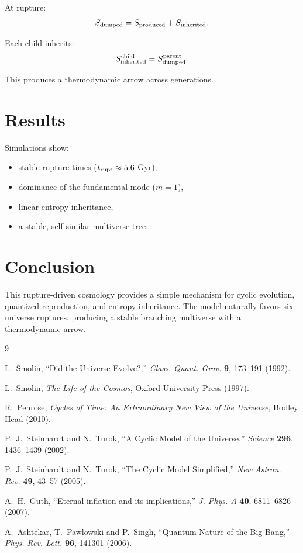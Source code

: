 \documentclass[12pt]{article}
\begin{document}
At rupture:
\begin{equation}
S_{\rm dumped} = S_{\rm produced} + S_{\rm inherited}.
\end{equation}

Each child inherits:
\begin{equation}
S_{\rm inherited}^{\rm child} = S_{\rm dumped}^{\rm parent}.
\end{equation}

This produces a thermodynamic arrow across generations.

\section{Results}

Simulations show:
\begin{itemize}
\item stable rupture times ($t_{\rm rupt} \approx 5.6$ Gyr),
\item dominance of the fundamental mode ($m=1$),
\item linear entropy inheritance,
\item a stable, self-similar multiverse tree.
\end{itemize}

\section{Conclusion}

This rupture-driven cosmology provides a simple mechanism for cyclic evolution, quantized reproduction, and entropy inheritance. The model naturally favors six-universe ruptures, producing a stable branching multiverse with a thermodynamic arrow.

\begin{thebibliography}{9}

L.~Smolin,
``Did the Universe Evolve?,'' 
\textit{Class. Quant. Grav.} \textbf{9}, 173--191 (1992).

L.~Smolin,
\textit{The Life of the Cosmos},
Oxford University Press (1997).

R.~Penrose,
\textit{Cycles of Time: An Extraordinary New View of the Universe},
Bodley Head (2010).

P.~J.~Steinhardt and N.~Turok,
``A Cyclic Model of the Universe,''
\textit{Science} \textbf{296}, 1436--1439 (2002).

P.~J.~Steinhardt and N.~Turok,
``The Cyclic Model Simplified,''
\textit{New Astron. Rev.} \textbf{49}, 43--57 (2005).

A.~H.~Guth,
``Eternal inflation and its implications,''
\textit{J. Phys. A} \textbf{40}, 6811--6826 (2007).

A.~Ashtekar, T.~Pawlowski and P.~Singh,
``Quantum Nature of the Big Bang,''
\textit{Phys. Rev. Lett.} \textbf{96}, 141301 (2006).

\end{thebibliography}
\end{document}
